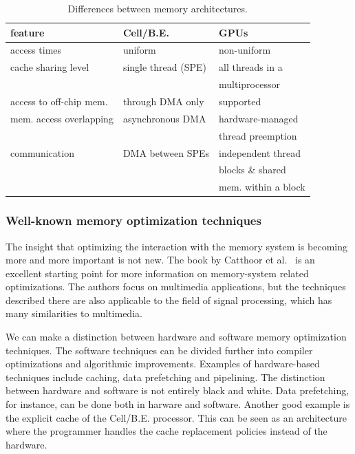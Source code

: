 \documentclass{article}
\begin{document}
\begin{table}[t]
\begin{center}
{\footnotesize
\begin{tabular}{|l|l|l|}
\hline
feature                   & Cell/B.E.                      & GPUs \\
\hline
access times              & uniform                        & non-uniform \\
\hline
cache sharing level       & single thread (SPE)            & all threads in a \\
                          &                                & multiprocessor \\
\hline
access to off-chip mem.   & through DMA only               & supported \\
\hline
mem. access overlapping   & asynchronous DMA               & hardware-managed \\
                          &                                & thread preemption \\
\hline
communication             & DMA between SPEs               & independent thread  \\
                          &                                & blocks \& shared   \\
                          &                                & mem. within a block \\
\hline
\end{tabular}
} %
\end{center}
\vspace{-0.5cm}
\caption{Differences between memory architectures.}
\label{memory-properties}
\end{table}



\subsubsection{Well-known memory optimization techniques}

The insight that optimizing the interaction with the memory system is becoming more and more important
is not new.  The book by Catthoor et al.~\cite{data-access} is an
excellent starting point for more information on memory-system related
optimizations. The authors focus on multimedia applications, but the
techniques described there are also applicable to the field of signal
processing, which has many similarities to multimedia.  

We can
make a distinction between hardware and software memory optimization techniques. 
The software techniques can be divided further into compiler optimizations and
algorithmic improvements.
Examples of hardware-based techniques include caching, data
prefetching and pipelining.  The distinction between hardware and
software is not entirely black and white. Data prefetching, for instance,
can be done both in harware and software.
Another good example is the
explicit cache of the Cell/B.E. processor. This can be seen as an
architecture where the programmer handles the cache replacement
policies instead of the hardware.
\end{document}
